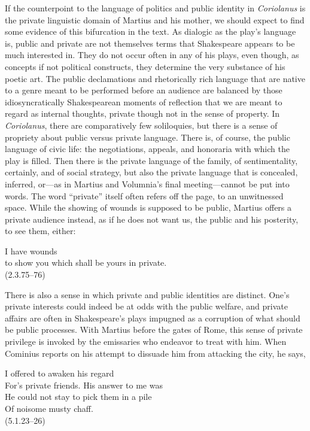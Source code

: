 If the counterpoint to the language of politics and public identity in \emph{Coriolanus} is the private linguistic domain of Martius and his mother, we should expect to find some evidence of this bifurcation in the text.
As dialogic as the play's language is, public and private are not themselves terms that Shakespeare appears to be much interested in.
They do not occur often in any of his plays, even though, as concepts if not political constructs, they determine the very substance of his poetic art.
The public declamations and rhetorically rich language that are native to a genre meant to be performed before an audience are balanced by those idiosyncratically Shakespearean moments of reflection that we are meant to regard as internal thoughts, private though not in the sense of property.
In \emph{Coriolanus}, there are comparatively few soliloquies, but there is a sense of propriety about public versus private language.
There is, of course, the public language of civic life: the negotiations, appeals, and honoraria with which the play is filled.
Then there is the private language of the family, of sentimentality, certainly, and of social strategy, but also the private language that is concealed, inferred, or---as in Martius and Volumnia's final meeting---cannot be put into words.
The word ``private'' itself often refers off the page, to an unwitnessed space.
While the showing of wounds is supposed to be public, Martius offers a private audience instead, as if he does not want us, the public and his posterity, to see them, either:
\begin{vq}
I have wounds\\
to show you which shall be yours in private.\\
\hfill(2.3.75--76)
\end{vq}
There is also a sense in which private and public identities are distinct. 
One's private interests could indeed be at odds with the public welfare, and private affairs are often in Shakespeare's plays impugned as a corruption of what should be public processes.
With Martius before the gates of Rome, this sense of private privilege is invoked by the emissaries who endeavor to treat with him.
When Cominius reports on his attempt to dissuade him from attacking the city, he says,
\begin{vq}
I offered to awaken his regard\\
For's private friends. His answer to me was\\
He could not stay to pick them in a pile\\
Of noisome musty chaff.\\
\hfill(5.1.23--26)
\end{vq}
